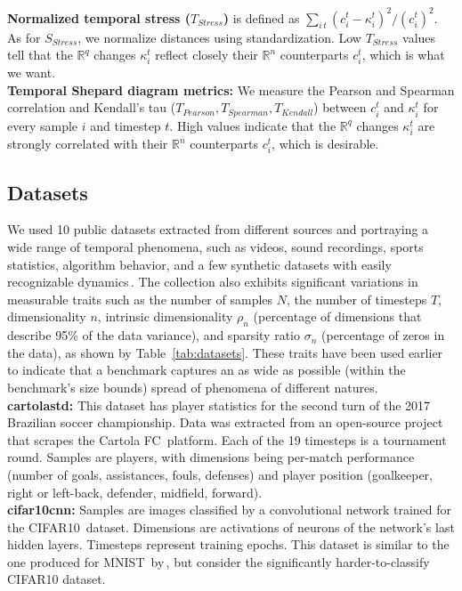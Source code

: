 \noindent\textbf{Normalized temporal stress ($T_{Stress}$)} is defined as $\sum_{i\, t}{(c_{i}^{t}-\kappa_{i}^{t})^{2}} / { (c_{i}^t)^{2}}$. As for $S_{Stress}$, we normalize distances using standardization. Low $T_{Stress}$ values tell that the $\mathbb{R}^q$ changes $\kappa_i^t$ reflect closely their $\mathbb{R}^n$ counterparts ${c_i^t}$, which is what we want.\\

\noindent\textbf{Temporal Shepard diagram metrics:} We measure the Pearson and Spearman correlation and Kendall's tau ($T_{Pearson}, T_{Spearman}, T_{Kendall}$) 
between $c_i^t$ and $\kappa_i^t$ for every sample $i$ and timestep $t$. High values indicate that the $\mathbb{R}^q$ changes $\kappa_i^t$ are strongly correlated with their $\mathbb{R}^n$ counterparts $c_i^t$, which is desirable.

\subsection{Datasets}
\label{sec:datasets}
%
We used 10 public datasets extracted from different sources and portraying a wide range of temporal phenomena, such as videos, sound recordings, sports statistics, algorithm behavior, and a few synthetic datasets with easily recognizable dynamics\,\citep{repo-guided}. The collection also exhibits significant variations in measurable traits such as the number of samples $N$, the number of timesteps $T$, dimensionality $n$, intrinsic dimensionality $\rho_n$ (percentage of dimensions that describe 95\% of the data variance), and sparsity ratio $\sigma_n$ (percentage of zeros in the data), as shown by Table~\ref{tab:datasets}. These traits have been used earlier\,\citep{Espadoto19} to indicate that a benchmark captures an as wide as possible (within the benchmark's size bounds) spread of phenomena of different natures.\\

\noindent\textbf{cartolastd:} This dataset has player statistics for the second turn of the 2017 Brazilian soccer championship. Data was extracted from an open-source project\,\citep{dataset:cartola} that scrapes the Cartola FC\,\citep{dataset:cartola} platform. Each of the 19 timesteps is a tournament round. Samples are players, with dimensions being per-match performance (number of goals, assistances, fouls, defenses) and player position (goalkeeper, right or left-back, defender, midfield, forward).\\

\noindent\textbf{cifar10cnn:} Samples are images classified by a convolutional network trained for the CIFAR10\,\citep{dataset:cifar10} dataset. 
Dimensions are activations of neurons of the network's last hidden layers. Timesteps represent training epochs. This dataset is similar to the one produced for MNIST\,\citep{dataset:mnist} by\,\cite{Rauber2017}, but consider the significantly harder-to-classify CIFAR10 dataset.\\

